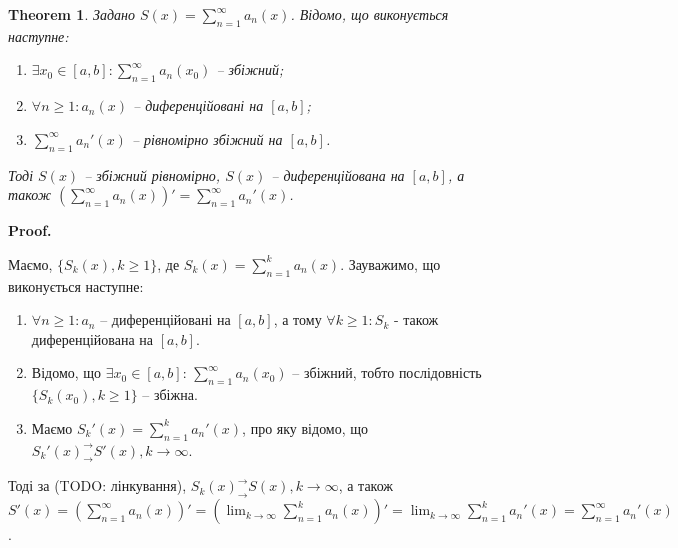\documentclass[a4paper, 10pt]{article}
\makeatletter
\def\huge{\displaystyle}
\def\qed{$\blacksquare$}
\theoremstyle{theoremdd}
\newtheorem{theorem}{Theorem}[subsection]
\theoremstyle{theoremdd}
\theoremstyle{theoremdd}
\theoremstyle{theoremdd}
\theoremstyle{theoremdd}
\theoremstyle{theoremdd}
\theoremstyle{theoremdd}
\theoremstyle{theoremdd}
\theoremstyle{theoremdd}
\renewenvironment{proof}[1][Proof.\\]{\par
\pushQED{\hfill \qed}%
\normalfont \topsep6\p@\@plus6\p@\relax
\trivlist
\item\relax
{\bfseries
#1\@addpunct{.}}\hspace\labelsep\ignorespaces
}{%
\popQED\endtrivlist\@endpefalse
}
\makeatother
\begin{document}
\begin{theorem}
Задано $S(x) = \huge \sum_{n=1}^\infty a_n(x)$. Відомо, що виконується наступне:
\begin{enumerate}[nosep,wide=0pt,label={\arabic*)}]
\item $\exists x_0 \in [a,b]: \huge \sum_{n=1}^\infty a_n(x_0)$ -- збіжний;
\item $\forall n \geq 1: a_n(x)$ -- диференційовані на $[a,b]$;
\item $\huge \sum_{n=1}^\infty a_n'(x)$ -- рівномірно збіжний на $[a,b]$.
\end{enumerate}
Тоді $S(x)$ -- збіжний рівномірно, $S(x)$ -- диференційована на $[a,b]$, а також $\huge \left(  \sum_{n=1}^\infty a_n(x) \right)' = \sum_{n=1}^\infty a_n'(x)$.
\end{theorem}

\begin{proof}
Маємо, $\{S_k(x), k \geq 1\}$, де $S_k(x) = \huge\sum_{n=1}^k a_n(x)$. Зауважимо, що виконується наступне:
\begin{enumerate}[nosep,wide=0pt,label={\arabic*)}]
\item $\forall n \geq 1: a_n$ -- диференційовані на $[a,b]$, а тому $\forall k \geq 1: S_k$ - також диференційована на $[a,b]$.
\item Відомо, що $\exists x_0 \in [a,b]$: $\huge\sum_{n=1}^\infty a_n(x_0)$ -- збіжний, тобто послідовність $\{S_k(x_0), k \geq 1\}$ -- збіжна.
\item Маємо $S_k'(x) = \huge\sum_{n=1}^k a_n'(x)$, про яку відомо, що $S_k'(x)^\rightarrow_\rightarrow S'(x), k \to \infty$.
\end{enumerate}
Тоді за (TODO: лінкування), $S_k(x)^\rightarrow_\rightarrow S(x), k \to \infty$, а також\\
$S'(x) = \huge\left(\sum_{n=1}^\infty a_n(x) \right)' = \left( \lim_{k \to \infty} \sum_{n=1}^k a_n(x) \right)' = \lim_{k \to \infty} \sum_{n=1}^k a_n'(x) = \sum_{n=1}^\infty a_n'(x)$.
\end{proof}

\iffalse
\begin{proof}
Розглянемо ряд $\tilde{S}(x) = \huge \sum_{n=1}^\infty a_n'(x)$. Оскільки $a_n' \in C([a,b])$, то автоматично $a_n' \in \mathcal{R}([a,b])$, а тому $\tilde{S}(x) \in \mathcal{R}([a,b])$. Тоді за попередньою теоремою, можемо отримати, що\\
$\forall x \in [a,b]: \huge \int_{x_0}^x \left( \sum_{n=1}^\infty a_n'(t) \right) \,dt = \sum_{n=1}^\infty \left( \int_{x_0}^x a_n'(t) \,dt \right) = \sum_{n=1}^\infty \left( a_n(x) - a_n(x_0) \right)$ - збіжний рівномірно ряд.\\
$\implies \huge \sum_{n=1}^\infty a_n(x) = \sum_{n=1}^\infty \left(a_n(x) - a_n(x_0) + a_n(x_0) \right) = \sum_{n=1}^\infty (a_n(x) - a_n(x_0)) + \sum_{n=1}^\infty a_n(x_0)$ - рівномірно збіжний.\\
Доведемо тотожність:\\
$ \huge \left( \sum_{n=1}^\infty a_n(x) \right)' = \left( \sum_{n=1}^\infty (a_n(x) - a_n(x_0)) \right)' + \left( \sum_{n=1}^\infty a_n(x_0) \right)' = \sum_{n=1}^\infty a_n'(x)$.
\end{proof}
\fi
\end{document}
